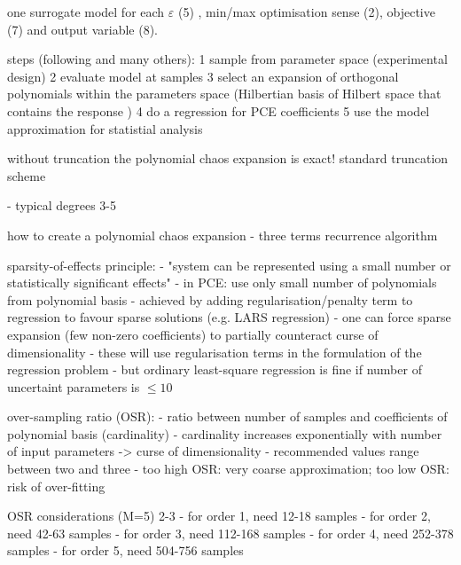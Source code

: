 one surrogate model for each $\varepsilon$ (5)  , min/max optimisation sense (2), objective (7) and output variable (8).

steps (following \cite{feinberg_chaospy_2015} and many others):
1 sample from parameter space (experimental design)
2 evaluate model at samples
3 select an expansion of orthogonal polynomials within the parameters space (Hilbertian basis of Hilbert space that contains the response \cite{sudret_global_2008})
4 do a regression for PCE coefficients
5 use the model approximation for statistial analysis

without truncation the polynomial chaos expansion is exact! \cite{fajraoui_optimal_2017}
standard truncation scheme \cite{gratiet_metamodel-based_2015,sudret_global_2008}

- typical degrees 3-5 \cite{gratiet_metamodel-based_2015}

how to create a polynomial chaos expansion
- three terms recurrence algorithm \cite{feinberg_chaospy_2015}

sparsity-of-effects principle:
- "system can be represented using a small number or statistically significant effects" \cite{berchier_multi-fidelity_nodate}
- in PCE: use only small number of polynomials from polynomial basis
- achieved by adding regularisation/penalty term to regression to favour sparse solutions (e.g. LARS regression)
- one can force sparse expansion (few non-zero coefficients) to partially counteract curse of dimensionality \cite{gratiet_metamodel-based_2015}
- these will use regularisation terms in the formulation of the regression problem
- but ordinary least-square regression is fine if number of uncertaint parameters is $\leq 10$ \cite{gratiet_metamodel-based_2015}

over-sampling ratio (OSR):
- ratio between number of samples and coefficients of polynomial basis (cardinality) \cite{palar_multi-fidelity_2016}
- cardinality increases exponentially with number of input parameters -> curse of dimensionality
- recommended values range between two and three \cite{hosder2007,palar_multi-fidelity_2016,fajraoui_optimal_2017,gratiet_metamodel-based_2015}
- too high OSR: very coarse approximation; too low OSR: risk of over-fitting \cite{palar_multi-fidelity_2016}

OSR considerations (M=5) 2-3
- for order 1, need 12-18 samples
- for order 2, need 42-63 samples
- for order 3, need 112-168 samples
- for order 4, need 252-378 samples
- for order 5, need 504-756 samples


